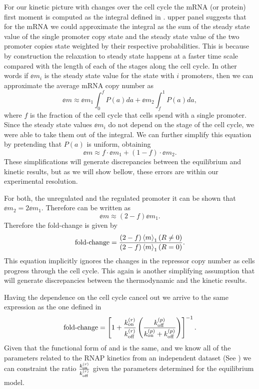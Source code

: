 For our kinetic picture with changes over the cell cycle the mRNA (or protein)
first moment is computed as the integral defined in .
 upper panel suggests that for the mRNA we
could approximate the integral as the sum of the steady state value of the
single promoter copy state and the steady state value of the two promoter copies
state weighted by their respective probabilities. This is because by
construction the relaxation to steady state happens at a faster time scale
compared with the length of each of the stages along the cell cycle. In other
words if $\ee{m}_i$ is the steady state value for the state with $i$ promoters,
then we can approximate the average mRNA copy number as
\begin{equation}
  \ee{m} \approx \ee{m}_1 \int_0^{f} P(a)da +
                 \ee{m}_2 \int_f^{1} P(a)da,
\end{equation}
where $f$ is the fraction of the cell cycle that cells spend with a single
promoter. Since the steady state values $\ee{m}_i$ do not depend on the stage
of the cell cycle, we were able to take them out of the integral. We can further
simplify this equation by pretending that $P(a)$ is uniform, obtaining
\begin{equation}
  \ee{m} \approx f \cdot \ee{m}_1 + (1 - f) \cdot \ee{m}_2.
  \label{eq_mRNA_mean_simplified}
\end{equation}
These simplifications will generate discrepancies between the equilibrium and
kinetic results, but as we will show bellow, these errors are within our
experimental resolution.

For both, the unregulated and the regulated promoter it can be shown that
$\ee{m}_2 = 2 \ee{m}_1$. Therefore  can be written
as
\begin{equation}
  \ee{m} \approx (2 - f) \ee{m}_1.
\end{equation}
Therefore the fold-change is given by
\begin{equation}
  \text{fold-change} = {(2 - f) \left\langle m \right\rangle_1(R \neq 0) \over (2 - f) \left\langle m \right\rangle_1(R = 0)}.
\end{equation}
This equation implicitly ignores the changes in the repressor copy number as
cells progress through the cell cycle. This again is another simplifying
assumption that will generate discrepancies between the thermodynamic and the
kinetic results.

Having the dependence on the cell cycle cancel out we arrive to the same
expression as the one defined in 
\begin{equation}
  \text{fold-change} = \left[ 1 + {k^{(r)}_{\text{on}} \over k^{(r)}_{\text{off}}}
                \left( {k^{(p)}_{\text{off}} \over k^{(p)}_{\text{on}} + k^{(p)}_{\text{off}}} \right)\right]^{-1}.
  \label{eq_fold_change_kinetic}
\end{equation}
Given that the functional form of  and
 is the same, and we know all of the parameters
related to the RNAP kinetics from an independent dataset (See ) we can constraint the ratio ${k^{(r)}_{\text{on}} \over
k^{(r)}_{\text{off}}}$ given the parameters determined for the equilibrium model.

